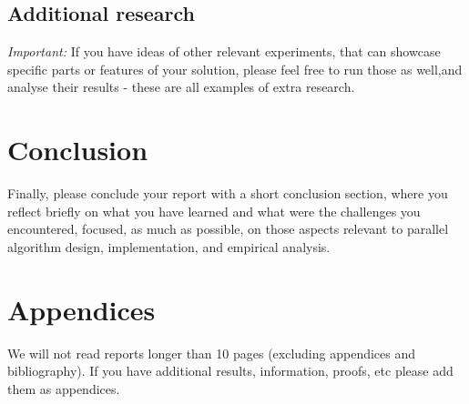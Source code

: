 \documentclass[a4paper,UKenglish,cleveref, autoref, thm-restate]{lipics-v2019}
\begin{document}
	\subsection{Additional research}
		\textit{Important:} If you have ideas of other relevant experiments, that can showcase specific parts or features of your solution, please feel free to run those as well,and analyse their results - these are all examples of extra research.

	\section{Conclusion}
		Finally, please conclude your report with a short conclusion section, where you reflect briefly on what you have learned and what were the challenges you encountered, focused, as much as possible, on those aspects relevant to parallel algorithm design, implementation, and empirical analysis.  

	\section*{Appendices}
		We will not read reports longer than 10 pages (excluding appendices and bibliography). If you have additional results, information, proofs, etc please add them as appendices.
	
	{\small
	
	
	}
	
\end{document}
